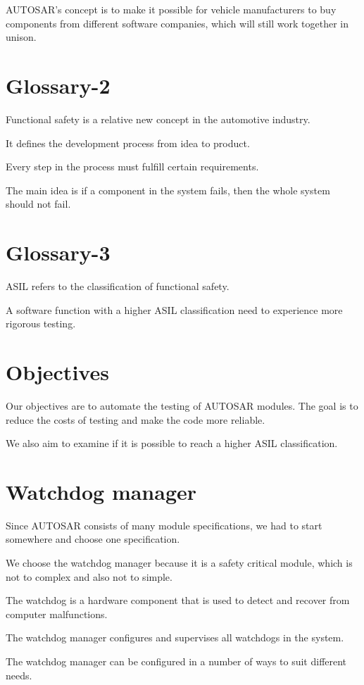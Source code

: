 \documentclass[a4paper]{article}
\begin{document}
AUTOSAR's concept is to make it possible for vehicle manufacturers to
buy components from different software companies, which will still
work together in unison.

\section{Glossary-2}
Functional safety is a relative new concept in the automotive
industry.

It defines the development process from idea to product.

Every step in the process must fulfill certain requirements.

The main idea is if a component in the system fails, then the whole
system should not fail.

\section{Glossary-3}
ASIL refers to the classification of functional safety.

A software function with a higher ASIL classification need to
experience more rigorous testing.

\section{Objectives}
Our objectives are to automate the testing of AUTOSAR modules. The
goal is to reduce the costs of testing and make the code more
reliable.

We also aim to examine if it is possible to reach a higher ASIL classification.

\section{Watchdog manager}
Since AUTOSAR consists of many module specifications, we had to start
somewhere and choose one specification.

We choose the watchdog manager because it is a safety critical module,
which is not to complex and also not to simple.

The watchdog is a hardware component that is used to detect and
recover from computer malfunctions.

The watchdog manager configures and supervises all watchdogs in the
system.

The watchdog manager can be configured in a number of ways to suit
different needs.
\end{document}
